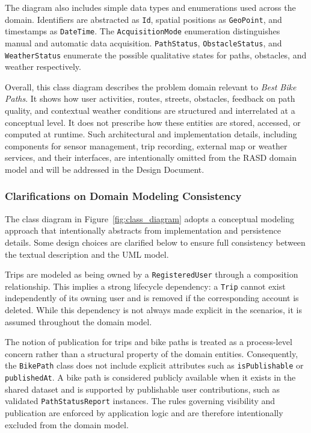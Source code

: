 \par The diagram also includes simple data types and enumerations used across the domain. Identifiers are abstracted as \texttt{Id}, spatial positions as \texttt{GeoPoint}, and timestamps as \texttt{DateTime}. The \texttt{AcquisitionMode} enumeration distinguishes manual and automatic data acquisition. \texttt{PathStatus}, \texttt{ObstacleStatus}, and \texttt{WeatherStatus} enumerate the possible qualitative states for paths, obstacles, and weather respectively.

\par Overall, this class diagram describes the problem domain relevant to \textit{Best Bike Paths}. It shows how user activities, routes, streets, obstacles, feedback on path quality, and contextual weather conditions are structured and interrelated at a conceptual level. It does not prescribe how these entities are stored, accessed, or computed at runtime. Such architectural and implementation details, including components for sensor management, trip recording, external map or weather services, and their interfaces, are intentionally omitted from the RASD domain model and will be addressed in the Design Document.

\subsubsection{Clarifications on Domain Modeling Consistency}
\label{sub:domain_modeling_clarifications}

\par The class diagram in Figure~\ref{fig:class_diagram} adopts a conceptual modeling approach that intentionally abstracts from implementation and persistence details. Some design choices are clarified below to ensure full consistency between the textual description and the UML model.

\par Trips are modeled as being owned by a \texttt{RegisteredUser} through a composition relationship. This implies a strong lifecycle dependency: a \texttt{Trip} cannot exist independently of its owning user and is removed if the corresponding account is deleted. While this dependency is not always made explicit in the scenarios, it is assumed throughout the domain model.

\par The notion of publication for trips and bike paths is treated as a process-level concern rather than a structural property of the domain entities. Consequently, the \texttt{BikePath} class does not include explicit attributes such as \texttt{isPublishable} or \texttt{publishedAt}. A bike path is considered publicly available when it exists in the shared dataset and is supported by publishable user contributions, such as validated \texttt{PathStatusReport} instances. The rules governing visibility and publication are enforced by application logic and are therefore intentionally excluded from the domain model.

